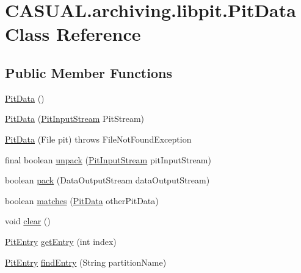 \hypertarget{class_c_a_s_u_a_l_1_1archiving_1_1libpit_1_1_pit_data}{\section{C\-A\-S\-U\-A\-L.\-archiving.\-libpit.\-Pit\-Data Class Reference}
\label{class_c_a_s_u_a_l_1_1archiving_1_1libpit_1_1_pit_data}
}
\subsection*{Public Member Functions}
\begin{DoxyCompactItemize}
\item 
\hyperlink{class_c_a_s_u_a_l_1_1archiving_1_1libpit_1_1_pit_data_a575807b0b55555f13263cb9e11b0e8f0}{Pit\-Data} ()
\item 
\hyperlink{class_c_a_s_u_a_l_1_1archiving_1_1libpit_1_1_pit_data_a5b8cfb6f9c2f8f3c70f35bfe464ef3d2}{Pit\-Data} (\hyperlink{class_c_a_s_u_a_l_1_1archiving_1_1libpit_1_1_pit_input_stream}{Pit\-Input\-Stream} Pit\-Stream)
\item 
\hyperlink{class_c_a_s_u_a_l_1_1archiving_1_1libpit_1_1_pit_data_a9e4e20dbeacb01785f44e8e17bc38dee}{Pit\-Data} (File pit)  throws File\-Not\-Found\-Exception 
\item 
final boolean \hyperlink{class_c_a_s_u_a_l_1_1archiving_1_1libpit_1_1_pit_data_a5c3639c6e3b5d9a75f105abccb033e20}{unpack} (\hyperlink{class_c_a_s_u_a_l_1_1archiving_1_1libpit_1_1_pit_input_stream}{Pit\-Input\-Stream} pit\-Input\-Stream)
\item 
boolean \hyperlink{class_c_a_s_u_a_l_1_1archiving_1_1libpit_1_1_pit_data_ae1127a2be4d3e84705e23fcc8272d406}{pack} (Data\-Output\-Stream data\-Output\-Stream)
\item 
boolean \hyperlink{class_c_a_s_u_a_l_1_1archiving_1_1libpit_1_1_pit_data_ae1ee835acd4523c6e6d2d87d77dce53c}{matches} (\hyperlink{class_c_a_s_u_a_l_1_1archiving_1_1libpit_1_1_pit_data}{Pit\-Data} other\-Pit\-Data)
\item 
void \hyperlink{class_c_a_s_u_a_l_1_1archiving_1_1libpit_1_1_pit_data_a25d720cdeb7e6b50f2816d1fd4af4784}{clear} ()
\item 
\hyperlink{class_c_a_s_u_a_l_1_1archiving_1_1libpit_1_1_pit_entry}{Pit\-Entry} \hyperlink{class_c_a_s_u_a_l_1_1archiving_1_1libpit_1_1_pit_data_a74e2d83ff8b0a83e36bebbf96891c37c}{get\-Entry} (int index)
\item 
\hyperlink{class_c_a_s_u_a_l_1_1archiving_1_1libpit_1_1_pit_entry}{Pit\-Entry} \hyperlink{class_c_a_s_u_a_l_1_1archiving_1_1libpit_1_1_pit_data_ab1a4b23f0380c3e2ce26d85e519bd15a}{find\-Entry} (String partition\-Name)

\end{DoxyCompactItemize}

